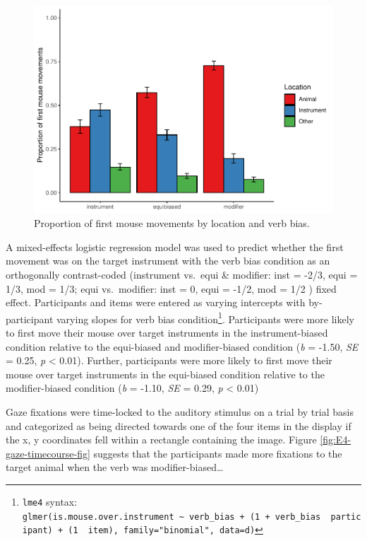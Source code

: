 \documentclass[
  english,
  man,floatsintext]{apa6}
\begin{document}
\begin{figure}
\centering
\includegraphics{manuscript_files/figure-latex/E4-mouse-moves-fig-1.pdf}
\caption{\label{fig:E4-mouse-moves-fig}Proportion of first mouse movements by location and verb bias.}
\end{figure}

A mixed-effects logistic regression model was used to predict whether the first movement was on the target instrument with the verb bias condition as an orthogonally contrast-coded (instrument vs.~equi \& modifier: inst = -2/3, equi = 1/3, mod = 1/3; equi vs.~modifier: inst = 0, equi = -1/2, mod = 1/2 ) fixed effect. Participants and items were entered as varying intercepts with by-participant varying slopes for verb bias condition\footnote{\texttt{lme4} syntax: \texttt{glmer(is.mouse.over.instrument\ \textasciitilde{}\ verb\_bias\ +\ (1\ +\ verb\_bias\ \textbar{}\ participant)\ +\ (1\ \textbar{}\ item),\ family="binomial",\ data=d)}}. Participants were more likely to first move their mouse over target instruments in the instrument-biased condition relative to the equi-biased and modifier-biased condition (\emph{b} = -1.50, \emph{SE} = 0.25, \emph{p} \textless{} 0.01). Further, participants were more likely to first move their mouse over target instruments in the equi-biased condition relative to the modifier-biased condition (\emph{b} = -1.10, \emph{SE} = 0.29, \emph{p} \textless{} 0.01)

Gaze fixations were time-locked to the auditory stimulus on a trial by trial basis and categorized as being directed towards one of the four items in the display if the x, y coordinates fell within a rectangle containing the image. Figure \ref{fig:E4-gaze-timecourse-fig} suggests that the participants made more fixations to the target animal when the verb was modifier-biased\ldots{}
\end{document}
